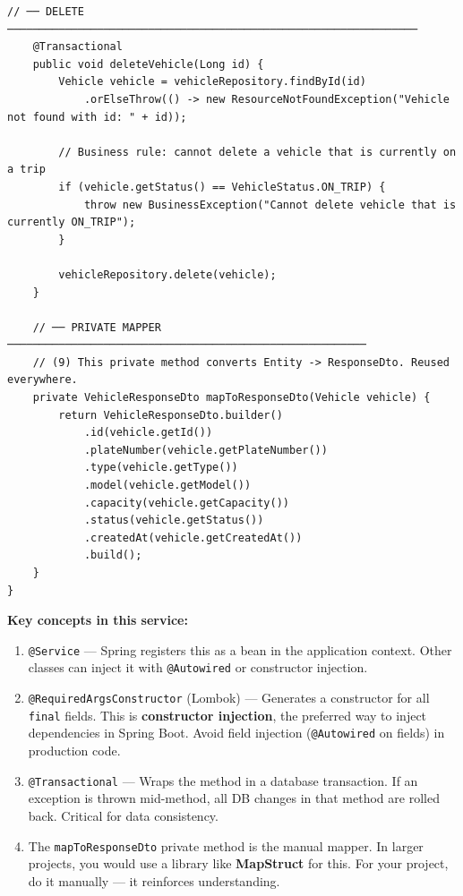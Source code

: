 \documentclass[12pt,a4paper]{report}
\newcommand{\term}[1]{\textbf{\textcolor{primaryblue}{#1}}}
\newcommand{\code}[1]{\texttt{\textcolor{keywordblue}{#1}}}
\begin{document}
\begin{lstlisting}[caption=VehicleService.java -- Business Logic Layer]
    // ── DELETE ────────────────────────────────────────────────────────────────
    @Transactional
    public void deleteVehicle(Long id) {
        Vehicle vehicle = vehicleRepository.findById(id)
            .orElseThrow(() -> new ResourceNotFoundException("Vehicle not found with id: " + id));

        // Business rule: cannot delete a vehicle that is currently on a trip
        if (vehicle.getStatus() == VehicleStatus.ON_TRIP) {
            throw new BusinessException("Cannot delete vehicle that is currently ON_TRIP");
        }

        vehicleRepository.delete(vehicle);
    }

    // ── PRIVATE MAPPER ────────────────────────────────────────────────────────
    // (9) This private method converts Entity -> ResponseDto. Reused everywhere.
    private VehicleResponseDto mapToResponseDto(Vehicle vehicle) {
        return VehicleResponseDto.builder()
            .id(vehicle.getId())
            .plateNumber(vehicle.getPlateNumber())
            .type(vehicle.getType())
            .model(vehicle.getModel())
            .capacity(vehicle.getCapacity())
            .status(vehicle.getStatus())
            .createdAt(vehicle.getCreatedAt())
            .build();
    }
}
\end{lstlisting}

\textbf{Key concepts in this service:}

\begin{enumerate}
  \item \code{@Service} --- Spring registers this as a bean in the application context. Other classes can inject it with \code{@Autowired} or constructor injection.
  \item \code{@RequiredArgsConstructor} (Lombok) --- Generates a constructor for all \code{final} fields. This is \term{constructor injection}, the preferred way to inject dependencies in Spring Boot. Avoid field injection (\code{@Autowired} on fields) in production code.
  \item \code{@Transactional} --- Wraps the method in a database transaction. If an exception is thrown mid-method, all DB changes in that method are rolled back. Critical for data consistency.
  \item The \code{mapToResponseDto} private method is the manual mapper. In larger projects, you would use a library like \textbf{MapStruct} for this. For your project, do it manually --- it reinforces understanding.
\end{enumerate}
\end{document}
